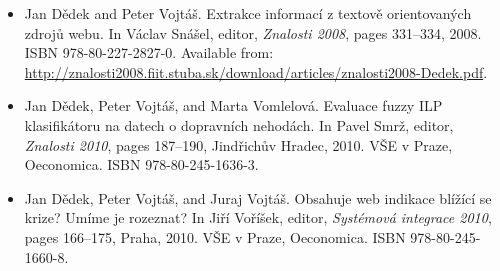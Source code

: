 \documentclass[12pt,a4paper,twoside,notitlepage]{article}
\begin{document}
\begin{itemize}





\item
Jan D{\v{e}}dek and Peter Vojt{\'{a}}{\v{s}}.
\newblock Extrakce informac{\'{i}} z textov{\v{e}} orientovan{\'{y}}ch
  zdrojů webu.
\newblock In V{\'{a}}clav Sn{\'{a}}{\v{s}}el, editor, {\em Znalosti 2008},
  pages 331--334, 2008.
\newblock ISBN 978-80-227-2827-0.
\newblock Available from:
  \url{http://znalosti2008.fiit.stuba.sk/download/articles/znalosti2008-Dedek.pdf}.


\item
Jan D{\v{e}}dek, Peter Vojt{\'{a}}{\v{s}}, and Marta Vomlelov{\'{a}}.
\newblock Evaluace fuzzy {ILP} klasifik{\'{a}}toru na datech o dopravn{\'{i}}ch
  nehod{\'{a}}ch.
\newblock In Pavel Smr{\v{z}}, editor, {\em Znalosti 2010}, pages 187--190,
  Jind{\v{r}}ichův Hradec, 2010. V{\v{S}}E v Praze, Oeconomica.
\newblock ISBN 978-80-245-1636-3.



\item
Jan D{\v{e}}dek, Peter Vojt{\'{a}}{\v{s}}, and Juraj Vojt{\'{a}}{\v{s}}.
\newblock Obsahuje web indikace bl\'{i}\v{z}\'{i}c\'{i} se krize? {U}m\'{i}me
  je rozeznat?
\newblock In Ji\v{r}\'{i} Vo\v{r}\'{i}\v{s}ek, editor, {\em Syst\'{e}mov\'{a}
  integrace 2010}, pages 166--175, Praha, 2010. V{\v{S}}E v Praze, Oeconomica.
\newblock ISBN 978-80-245-1660-8.


\end{itemize}




















\newpage
\end{document}
